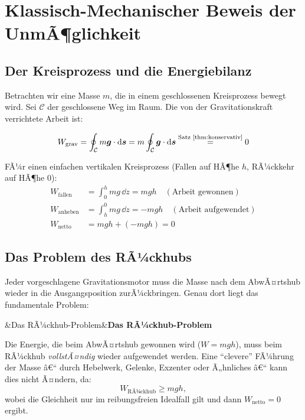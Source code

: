 ﻿\documentclass[12pt, a4paper]{report}
\newenvironment{wichtig}[1][]{%
  \begin{wichtigframe}\sloppy%
  \ifx&#1&\else\textbf{#1}\par\smallskip\fi}{\end{wichtigframe}}
\theoremstyle{definition}
\theoremstyle{remark}
\newcommand{\vek}[1]{\boldsymbol{#1}}
\begin{document}
\chapter{Klassisch-Mechanischer Beweis der UnmÃ¶glichkeit}
\label{sec:klassisch}

\section{Der Kreisprozess und die Energiebilanz}

Betrachten wir eine Masse $m$, die in einem geschlossenen Kreisprozess bewegt wird.
Sei $\mathcal{C}$ der geschlossene Weg im Raum. Die von der Gravitationskraft
verrichtete Arbeit ist:

\begin{equation}
  W_{\text{grav}} = \oint_{\mathcal{C}} m\vek{g} \cdot \dd\vek{s}
  = m \oint_{\mathcal{C}} \vek{g} \cdot \dd\vek{s}
  \stackrel{\text{Satz \ref{thm:konservativ}}}{=} 0
\end{equation}

FÃ¼r einen einfachen vertikalen Kreisprozess (Fallen auf HÃ¶he $h$, RÃ¼ckkehr auf
HÃ¶he $0$):
\begin{align}
  W_{\text{fallen}} &= \int_0^h m g \, \dd z = mgh \quad (\text{Arbeit gewonnen}) \\
  W_{\text{anheben}} &= \int_h^0 mg \, \dd z = -mgh \quad (\text{Arbeit aufgewendet}) \\
  W_{\text{netto}} &= mgh + (-mgh) = 0
\end{align}

\section{Das Problem des RÃ¼ckhubs}

Jeder vorgeschlagene Gravitationsmotor muss die Masse nach dem AbwÃ¤rtshub wieder
in die Ausgangsposition zurÃ¼ckbringen. Genau dort liegt das fundamentale Problem:

\begin{wichtig}[Das RÃ¼ckhub-Problem]
  Die Energie, die beim AbwÃ¤rtshub gewonnen wird ($W = mgh$), muss beim
  RÃ¼ckhub \emph{vollstÃ¤ndig} wieder aufgewendet werden. Eine ``clevere''
  FÃ¼hrung der Masse â€“ durch Hebelwerk, Gelenke, Exzenter oder Ã„hnliches â€“
  kann dies nicht Ã¤ndern, da:
  \begin{equation}
    W_{\text{RÃ¼ckhub}} \geq mgh,
  \end{equation}
  wobei die Gleichheit nur im reibungsfreien Idealfall gilt und dann
  $W_{\text{netto}} = 0$ ergibt.
\end{wichtig}
\end{document}
